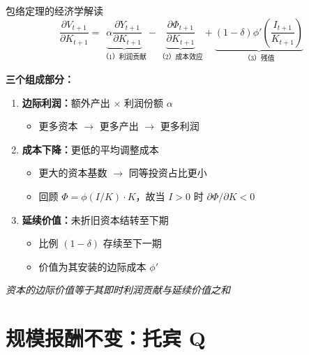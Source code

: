 \documentclass{beamer}
\begin{document}
\begin{frame}{包络定理的经济学解读}
    \begin{equation*}
        \frac{\partial V_{t+1}}{\partial K_{t+1}} = \underbrace{\alpha \frac{\partial Y_{t+1}}{\partial K_{t+1}}}_{\text{（1）利润贡献}} - \underbrace{\frac{\partial \Phi_{t+1}}{\partial K_{t+1}}}_{\text{（2）成本效应}} + \underbrace{(1-\delta) \phi'\left(\frac{I_{t+1}}{K_{t+1}}\right)}_{\text{（3）残值}}
    \end{equation*}


    \textbf{三个组成部分：}
    \begin{enumerate}
        \item \textbf{边际利润：}额外产出 $\times$ 利润份额 $\alpha$
        \begin{itemize}
            \item 更多资本 $\rightarrow$ 更多产出 $\rightarrow$ 更多利润
        \end{itemize}

        \item \textbf{成本下降：}更低的平均调整成本
        \begin{itemize}
            \item 更大的资本基数 $\rightarrow$ 同等投资占比更小
            \item 回顾 $\Phi = \phi(I/K) \cdot K$，故当 $I > 0$ 时 $\partial \Phi/\partial K < 0$
        \end{itemize}

        \item \textbf{延续价值：}未折旧资本结转至下期
        \begin{itemize}
            \item 比例 $(1-\delta)$ 存续至下一期
            \item 价值为其安装的边际成本 $\phi'$
        \end{itemize}
    \end{enumerate}

    \vspace{0.2cm}
    \textit{资本的边际价值等于其即时利润贡献与延续价值之和}
\end{frame}

\section{规模报酬不变：托宾 Q}
\end{document}
